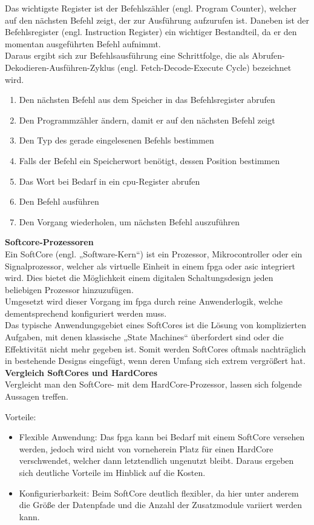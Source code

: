 Das wichtigste Register ist der Befehlszähler (engl. Program Counter), welcher auf den nächsten Befehl zeigt, der zur Ausführung aufzurufen ist. Daneben
ist der Befehlsregister (engl. Instruction Register) ein wichtiger Bestandteil, da er den momentan ausgeführten Befehl aufnimmt.\\
Daraus ergibt sich zur Befehlsausführung eine Schrittfolge, die als Abrufen-Dekodieren-Ausführen-Zyklus (engl. Fetch-Decode-Execute Cycle) bezeichnet wird.~\cite{cache}
\begin{enumerate}
  \item Den nächsten Befehl aus dem Speicher in das Befehlsregister abrufen
  \item Den Programmzähler ändern, damit er auf den nächsten Befehl zeigt
  \item Den Typ des gerade eingelesenen Befehls bestimmen
  \item Falls der Befehl ein Speicherwort benötigt, dessen Position bestimmen
  \item Das Wort bei Bedarf in ein \ac{cpu}-Register abrufen
  \item Den Befehl ausführen
  \item Den Vorgang wiederholen, um nächsten Befehl auszuführen
\end{enumerate}

\textbf{Softcore-Prozessoren}\\
Ein SoftCore (engl. „Software-Kern“) ist ein Prozessor, Mikrocontroller oder ein Signalprozessor, welcher als virtuelle Einheit in einem \ac{fpga} oder \ac{asic} integriert wird.
Dies bietet die Möglichkeit einem digitalen Schaltungsdesign jeden beliebigen Prozessor hinzuzufügen.\\
Umgesetzt wird dieser Vorgang im \ac{fpga} durch reine Anwenderlogik,
welche dementsprechend konfiguriert werden muss.\\
Das typische Anwendungsgebiet eines SoftCores ist die Lösung von komplizierten Aufgaben, mit denen klassische „State Machines“ überfordert sind oder die Effektivität
 nicht mehr gegeben ist. Somit werden SoftCores oftmals nachträglich in bestehende Designs eingefügt, wenn deren Umfang sich extrem vergrößert hat.\cite{softcore}\\

\textbf{Vergleich SoftCores und HardCores}\\
Vergleicht man den SoftCore- mit dem HardCore-Prozessor, lassen sich folgende Aussagen treffen.

Vorteile:
\begin{itemize}
   \item Flexible Anwendung: Das \ac{fpga} kann bei Bedarf mit einem SoftCore versehen werden, jedoch wird nicht von vorneherein Platz für einen HardCore verschwendet, welcher
    dann letztendlich ungenutzt bleibt. Daraus ergeben sich deutliche Vorteile im Hinblick auf die Kosten.
    \item Konfigurierbarkeit: Beim SoftCore deutlich flexibler, da hier unter anderem die Größe der Datenpfade und die Anzahl der Zusatzmodule variiert werden kann.
 \end{itemize}


